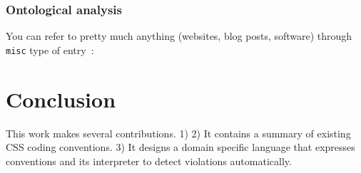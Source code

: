 \documentclass[parskip=full]{uvamscse}
\begin{document}
\subsection{Ontological analysis}

You can refer to pretty much anything (websites, blog posts, software) through
\texttt{misc} type of entry~\cite{ANTLR}:


\chapter{Conclusion}

This work makes several contributions. 1) 2) It contains a summary of existing
CSS coding conventions. 3) It designs a domain specific language that expresses
conventions and its interpreter to detect violations automatically.

{%


}
\end{document}
